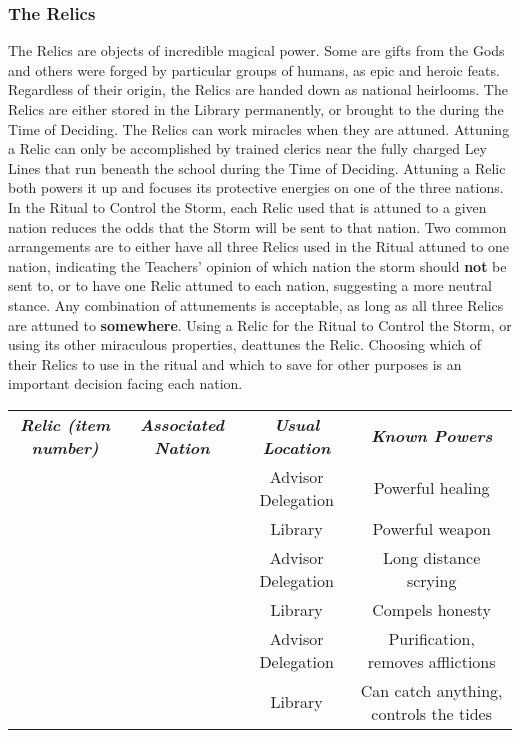 \documentclass[blue]{GL2020}
\begin{document}
\subsubsection*{The Relics}
The Relics are objects of incredible magical power. Some are gifts from the Gods and others were forged by particular groups of humans, as epic and heroic feats. Regardless of their origin, the Relics are handed down as national heirlooms. The Relics are either stored in the \pSchool{} Library permanently, or brought to the \pSc{}during the Time of Deciding. The Relics can work miracles when they are attuned. Attuning a Relic can only be accomplished by trained clerics near the fully charged Ley Lines that run beneath the school during the Time of Deciding. Attuning a Relic both powers it up and focuses its protective energies on one of the three nations. In the Ritual to Control the Storm, each Relic used that is attuned to a given nation reduces the odds that the Storm will be sent to that nation. Two common arrangements are to either have all three Relics used in the Ritual attuned to one nation, indicating the Teachers’ opinion of which nation the storm should \textbf{not} be sent to, or to have one Relic attuned to each nation, suggesting a more neutral stance. Any combination of attunements is acceptable, as long as all three Relics are attuned to \textbf{somewhere}. Using a Relic for the Ritual to Control the Storm, or using its other miraculous properties, deattunes the Relic. Choosing which of their Relics to use in the ritual and which to save for other purposes is an important decision facing each nation.

\begin{tabularx}{\textwidth}{|>{\centering\arraybackslash}c | >{\centering\arraybackslash}c | >{\centering\arraybackslash}c | >{\centering\arraybackslash}c |}
\hline
    \multicolumn{4}{|c|}{\textbf{The Relics}} \\
\hline
    \emph{\textbf{Relic (item number)}} & \emph{\textbf{Associated Nation}} & \emph{\textbf{Usual Location}} & \emph{\textbf{Known Powers}}\\
\hline
    \iPitcher{} & \pFarm{} & Advisor Delegation & Powerful healing\\
\hline
    \iScythe{} & \pFarm{} & Library & Powerful weapon\\
\hline
    \iMirror{} & \pTech{} & Advisor Delegation & Long distance scrying\\
\hline
    \iLariat{} & \pTech{} & Library & Compels honesty\\
\hline
    \iChalice{} & \pShip{} & Advisor Delegation & Purification, removes afflictions\\
\hline
    \iNet{} & \pShip{} & Library & Can catch anything, controls the tides\\
\hline
\end{tabularx}
\end{document}
